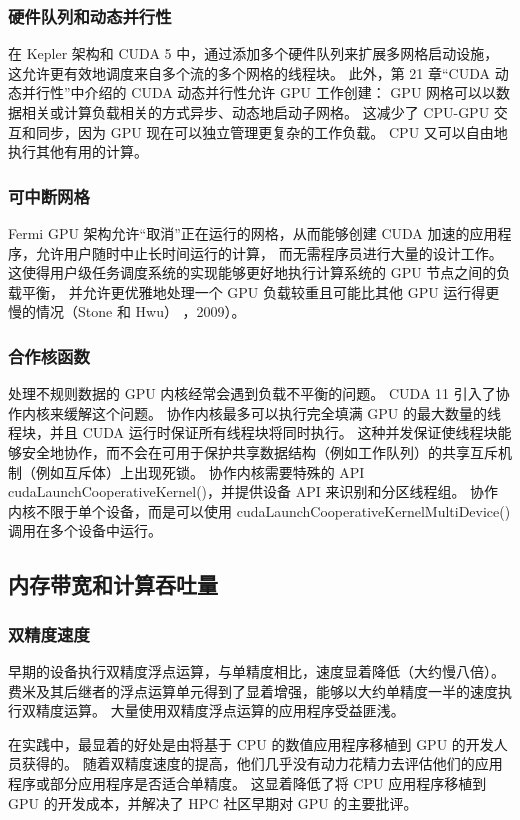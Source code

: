 \subsubsection{硬件队列和动态并行性}
在 Kepler 架构和 CUDA 5 中，通过添加多个硬件队列来扩展多网格启动设施，这允许更有效地调度来自多个流的多个网格的线程块。 
此外，第 21 章“CUDA 动态并行性”中介绍的 CUDA 动态并行性允许 GPU 工作创建：
GPU 网格可以以数据相关或计算负载相关的方式异步、动态地启动子网格。 
这减少了 CPU-GPU 交互和同步，因为 GPU 现在可以独立管理更复杂的工作负载。 CPU 又可以自由地执行其他有用的计算。

\subsubsection{可中断网格}
Fermi GPU 架构允许“取消”正在运行的网格，从而能够创建 CUDA 加速的应用程序，允许用户随时中止长时间运行的计算，
而无需程序员进行大量的设计工作。 这使得用户级任务调度系统的实现能够更好地执行计算系统的 GPU 节点之间的负载平衡，
并允许更优雅地处理一个 GPU 负载较重且可能比其他 GPU 运行得更慢的情况（Stone 和 Hwu） ，2009）。

\subsubsection{合作核函数}
处理不规则数据的 GPU 内核经常会遇到负载不平衡的问题。 CUDA 11 引入了协作内核来缓解这个问题。 
协作内核最多可以执行完全填满 GPU 的最大数量的线程块，并且 CUDA 运行时保证所有线程块将同时执行。 
这种并发保证使线程块能够安全地协作，而不会在可用于保护共享数据结构（例如工作队列）的共享互斥机制（例如互斥体）上出现死锁。 
协作内核需要特殊的 API cudaLaunchCooperativeKernel()，并提供设备 API 来识别和分区线程组。 
协作内核不限于单个设备，而是可以使用 cudaLaunchCooperativeKernelMultiDevice() 调用在多个设备中运行。

\subsection{内存带宽和计算吞吐量}
\subsubsection{双精度速度}
早期的设备执行双精度浮点运算，与单精度相比，速度显着降低（大约慢八倍）。 
费米及其后继者的浮点运算单元得到了显着增强，能够以大约单精度一半的速度执行双精度运算。 
大量使用双精度浮点运算的应用程序受益匪浅。

在实践中，最显着的好处是由将基于 CPU 的数值应用程序移植到 GPU 的开发人员获得的。 
随着双精度速度的提高，他们几乎没有动力花精力去评估他们的应用程序或部分应用程序是否适合单精度。 
这显着降低了将 CPU 应用程序移植到 GPU 的开发成本，并解决了 HPC 社区早期对 GPU 的主要批评。

